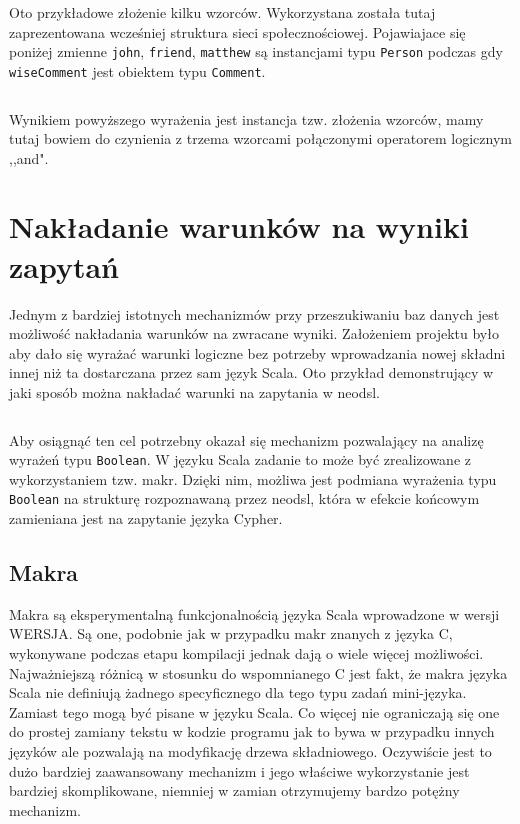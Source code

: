 \documentclass[brudnopis]{xmgr}
\begin{document}
Oto przykładowe złożenie kilku wzorców. Wykorzystana została tutaj zaprezentowana wcześniej struktura sieci społecznościowej. Pojawiajace się poniżej zmienne \texttt{john}, \texttt{friend}, \texttt{matthew} są instancjami typu \texttt{Person} podczas gdy \texttt{wiseComment} jest obiektem typu \texttt{Comment}.

\inputminted{scala}{listings/scala/dsl/patterns/functional-example-1.scala}

Wynikiem powyższego wyrażenia jest instancja tzw. złożenia wzorców, mamy tutaj bowiem do czynienia z trzema wzorcami połączonymi operatorem logicznym ,,and". 

\section{Nakładanie warunków na wyniki zapytań}

Jednym z bardziej istotnych mechanizmów przy przeszukiwaniu baz danych jest możliwość nakładania warunków na zwracane wyniki. Założeniem projektu było aby dało się wyrażać warunki logiczne bez potrzeby wprowadzania nowej składni innej niż ta dostarczana przez sam język Scala. Oto przykład demonstrujący w jaki sposób można nakładać warunki na zapytania w neodsl.

\inputminted{scala}{listings/scala/dsl/query-with-simple-condition.scala}

Aby osiągnąć ten cel potrzebny okazał się mechanizm pozwalający na analizę wyrażeń typu \texttt{Boolean}. W języku Scala zadanie to może być zrealizowane z wykorzystaniem tzw. makr. 
Dzięki nim, możliwa jest podmiana wyrażenia typu \texttt{Boolean} na strukturę rozpoznawaną przez neodsl, która w efekcie końcowym zamieniana jest na zapytanie języka Cypher.

\subsection{Makra}

Makra są eksperymentalną funkcjonalnością języka Scala wprowadzone w wersji WERSJA. Są one, podobnie jak w przypadku makr znanych z języka C, wykonywane podczas etapu kompilacji jednak dają o wiele więcej możliwości. Najważniejszą różnicą w stosunku do wspomnianego C jest fakt, że makra języka Scala nie definiują żadnego specyficznego dla tego typu zadań mini-języka. Zamiast tego mogą być pisane w języku Scala. Co więcej nie ograniczają się one do prostej zamiany tekstu w kodzie programu jak to bywa w przypadku innych języków ale pozwalają na modyfikację drzewa składniowego. Oczywiście jest to dużo bardziej zaawansowany mechanizm i jego właściwe wykorzystanie jest bardziej skomplikowane, niemniej w zamian otrzymujemy bardzo potężny mechanizm.
\end{document}
